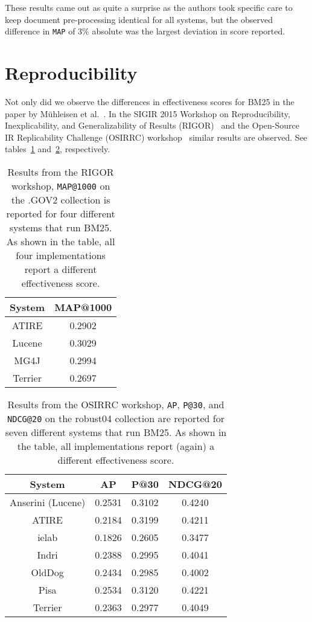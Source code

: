 These results came out as quite a surprise as the authors took specific care to keep document pre-processing identical for all systems, but the observed difference in \texttt{MAP} of 3\% absolute was the largest deviation in score reported.


\section{Reproducibility}
Not only did we observe the differences in effectiveness scores for BM25 in the paper by M\"{u}hleisen et al.~\cite{OldDog}. In the SIGIR 2015 Workshop on Reproducibility, Inexplicability, and Generalizability of Results (RIGOR)~\cite{RIGOR} and the Open-Source IR Replicability Challenge (OSIRRC) workshop~\cite{OSIRRC} similar results are observed. See tables~\ref{rigor_results} and~\ref{osirrc_results}, respectively.  

\begin{table}
	\centering
	\caption{Results from the RIGOR workshop\cite{RIGOR}, \texttt{MAP@1000} on the .GOV2 collection is reported for four different systems that run BM25. As shown in the table, all four implementations report a different effectiveness score.}
	\label{rigor_results}
	\begin{tabular}{c c}
		\toprule
		System &  MAP@1000 \\
		\midrule
		ATIRE & 0.2902 \\
		Lucene & 0.3029 \\
		MG4J & 0.2994 \\
		Terrier & 0.2697 \\
		\bottomrule
	\end{tabular}
\end{table}


\begin{table}
	\centering
	\caption{Results from the OSIRRC workshop\cite{OSIRRC}, \texttt{AP}, \texttt{P@30}, and \texttt{NDCG@20} on the robust04 collection are reported for seven different systems that run BM25. As shown in the table, all implementations report (again) a different effectiveness score.}
	\label{osirrc_results}
	\begin{tabular}{c c c c}
		\toprule
		System & AP & P@30 & NDCG@20 \\
		\midrule
		Anserini (Lucene) & 0.2531 & 0.3102 & 0.4240 \\
		ATIRE & 0.2184 & 0.3199 & 0.4211 \\
		ielab & 0.1826 & 0.2605 & 0.3477 \\
		Indri & 0.2388 & 0.2995 & 0.4041 \\
		OldDog & 0.2434 & 0.2985 & 0.4002 \\
		Pisa & 0.2534 & 0.3120 & 0.4221 \\
		Terrier & 0.2363 & 0.2977 & 0.4049 \\
		\bottomrule
	\end{tabular}
\end{table}

